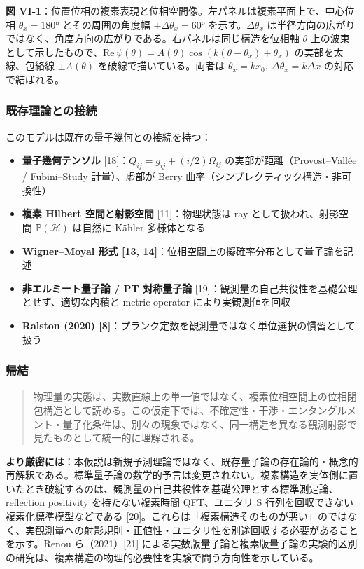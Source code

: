 \documentclass[
]{ltjsarticle}
\providecommand{\tightlist}{%
  \setlength{\itemsep}{0pt}\setlength{\parskip}{0pt}}
\begin{document}
\textbf{図
VI-1}：位置位相の複素表現と位相空間像。左パネルは複素平面上で、中心位相
\(\theta_x = 180°\) とその周囲の角度幅 \(\pm\Delta\theta_x = 60°\)
を示す。\(\Delta\theta_x\)
は半径方向の広がりではなく、角度方向の広がりである。右パネルは同じ構造を位相軸
\(\theta\)
上の波束として示したもので、\(\mathrm{Re}\,\psi(\theta) = A(\theta)\cos(k(\theta-\theta_x)+\theta_x)\)
の実部を太線、包絡線 \(\pm A(\theta)\) を破線で描いている。両者は
\(\theta_x = kx_0,\ \Delta\theta_x = k\Delta x\) の対応で結ばれる。

\subsubsection{既存理論との接続}\label{ux65e2ux5b58ux7406ux8ad6ux3068ux306eux63a5ux7d9a}

このモデルは既存の量子幾何との接続を持つ：

\begin{itemize}
\tightlist
\item
  \textbf{量子幾何テンソル}
  {[}18{]}：\(Q_{ij} = g_{ij} + (i/2)\Omega_{ij}\)
  の実部が距離（Provost--Vallée / Fubini--Study 計量）、虚部が Berry
  曲率（シンプレクティック構造・非可換性）
\item
  \textbf{複素 Hilbert 空間と射影空間} {[}11{]}：物理状態は ray
  として扱われ、射影空間 \(\mathbb{P}(\mathcal{H})\) は自然に Kähler
  多様体となる
\item
  \textbf{Wigner--Moyal 形式 {[}13,
  14{]}}：位相空間上の擬確率分布として量子論を記述
\item
  \textbf{非エルミート量子論 / PT 対称量子論}
  {[}19{]}：観測量の自己共役性を基礎公理とせず、適切な内積と metric
  operator により実観測値を回収
\item
  \textbf{Ralston (2020)
  {[}8{]}}：プランク定数を観測量ではなく単位選択の慣習として扱う
\end{itemize}

\subsubsection{帰結}\label{ux5e30ux7d50-5}

\begin{quote}
物理量の実態は、実数直線上の単一値ではなく、複素位相空間上の位相閉包構造として読める。この仮定下では、不確定性・干渉・エンタングルメント・量子化条件は、別々の現象ではなく、同一構造を異なる観測射影で見たものとして統一的に理解される。
\end{quote}

\textbf{より厳密には}：本仮説は新規予測理論ではなく、既存量子論の存在論的・概念的再解釈である。標準量子論の数学的予言は変更されない。複素構造を実体側に置いたとき破綻するのは、観測量の自己共役性を基礎公理とする標準測定論、reflection
positivity を持たない複素時間 QFT、ユニタリ S
行列を回収できない複素化標準模型などである
{[}20{]}。これらは「複素構造そのものが悪い」のではなく、実観測量への射影規則・正値性・ユニタリ性を別途回収する必要があることを示す。Renou
ら（2021）{[}21{]}
による実数版量子論と複素版量子論の実験的区別の研究は、複素構造の物理的必要性を実験で問う方向性を示している。
\end{document}
